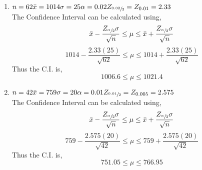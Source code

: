 \documentclass{book}
\begin{document}
    \begin{enumerate}
        \item 
        $n=62\\
        \Bar{x}=1014\\
        \sigma=25\\
        \alpha=0.02\\
        Z_{\sfrac{0.02}{2}}=Z_{0.01}=2.33\\$\\
        The Confidence Interval can be calculated using,
        \begin{equation*}
            \Bar{x}-\frac{Z_{\sfrac{\alpha}{2}}\sigma}{\sqrt{n}} \leq \mu \leq \Bar{x}+\frac{Z_{\sfrac{\alpha}{2}}\sigma}{\sqrt{n}}
        \end{equation*}
        \begin{equation*}
            1014-\frac{2.33(25)}{\sqrt{62}} \leq \mu \leq 1014+\frac{2.33(25)}{\sqrt{62}}
        \end{equation*}
        Thus the C.I. is,
        \begin{equation*}
            1006.6 \leq \mu \leq 1021.4
        \end{equation*}
        
        \item
        $n=42\\
        \Bar{x}=759\\
        \sigma=20\\
        \alpha=0.01\\
        Z_{\sfrac{0.01}{2}}=Z_{0.005}=2.575\\$\\
        The Confidence Interval can be calculated using,
        \begin{equation*}
            \Bar{x}-\frac{Z_{\sfrac{\alpha}{2}}\sigma}{\sqrt{n}} \leq \mu \leq \Bar{x}+\frac{Z_{\sfrac{\alpha}{2}}\sigma}{\sqrt{n}}
        \end{equation*}
        \begin{equation*}
            759-\frac{2.575(20)}{\sqrt{42}} \leq \mu \leq 759+\frac{2.575(20)}{\sqrt{42}}
        \end{equation*}
        Thus the C.I. is,
        \begin{equation*}
            751.05 \leq \mu \leq 766.95
        \end{equation*}
    \end{enumerate}
\end{document}
